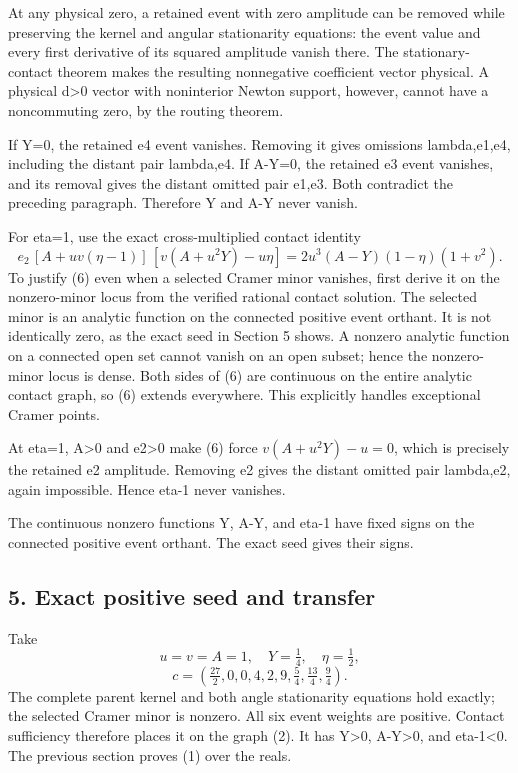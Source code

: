 At any physical zero, a retained event with zero amplitude can be removed
while preserving the kernel and angular stationarity equations: the event
value and every first derivative of its squared amplitude vanish there.
The stationary-contact theorem makes the resulting nonnegative coefficient
vector physical. A physical d\textgreater0 vector with noninterior Newton support,
however, cannot have a noncommuting zero, by the routing theorem.

If Y=0, the retained e4 event vanishes. Removing it gives omissions
lambda,e1,e4, including the distant pair lambda,e4. If A-Y=0, the retained
e3 event vanishes, and its removal gives the distant omitted pair e1,e3.
Both contradict the preceding paragraph. Therefore Y and A-Y never vanish.

For eta=1, use the exact cross-multiplied contact identity
\[
e_2\,[A+uv(\eta-1)]\,[v(A+u^2Y)-u\eta]
=2u^3(A-Y)(1-\eta)(1+v^2).
\tag{6}
\]
To justify (6) even when a selected Cramer minor vanishes, first derive it
on the nonzero-minor locus from the verified rational contact solution.
The selected minor is an analytic function on the connected positive event
orthant. It is not identically zero, as the exact seed in Section 5 shows.
A nonzero analytic function on a connected open set cannot vanish on an
open subset; hence the nonzero-minor locus is dense. Both sides of (6) are
continuous on the entire analytic contact graph, so (6) extends everywhere.
This explicitly handles exceptional Cramer points.

At eta=1, A\textgreater0 and e2\textgreater0 make (6) force
\(v(A+u^2Y)-u=0\), which is precisely the retained e2 amplitude. Removing
e2 gives the distant omitted pair lambda,e2, again impossible. Hence eta-1
never vanishes.

The continuous nonzero functions Y, A-Y, and eta-1 have fixed signs on the
connected positive event orthant. The exact seed gives their signs.

\hypertarget{exact-positive-seed-and-transfer}{%
\subsection{5. Exact positive seed and transfer}\label{pe31b9ef5ec43:exact-positive-seed-and-transfer}}

Take
\[
u=v=A=1,\quad Y=\tfrac14,\quad\eta=\tfrac12,
\]
\[
c=\left(\tfrac{27}{2},0,0,4,2,9,\tfrac54,
                 \tfrac{13}{4},\tfrac94\right).
\tag{7}
\]
The complete parent kernel and both angle stationarity equations hold
exactly; the selected Cramer minor is nonzero. All six event weights are
positive. Contact sufficiency therefore places it on the graph (2). It
has Y\textgreater0, A-Y\textgreater0, and eta-1\textless0. The previous section proves (1) over the reals.

